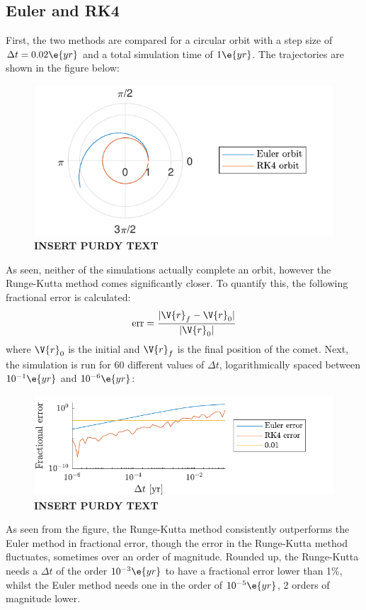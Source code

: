 \documentclass[a4paper,10pt]{article} 	%
\numberwithin{equation}{section}
\begin{document}
 	\subsection{Euler and RK4}
 	First, the two methods are compared for a circular orbit with a step size of $ \Delta t = 0.02 \e{yr} $ and a total simulation time of $ 1 \e{yr} $. The trajectories are shown in the figure below:
 	
	\begin{figure}[H]
		\centering
		\includegraphics[width=0.7\linewidth]{CircOrbit.pdf}
		\caption{\textbf{INSERT PURDY TEXT}}
		\label{fig:CircOrbit}
	\end{figure}
 	As seen, neither of the simulations actually complete an orbit, however the Runge-Kutta method comes significantly closer. To quantify this, the following fractional error is calculated:
 	\begin{equation}
 		\text{err} = \frac{|\V{r}_f-\V{r}_0|}{|\V{r}_0|}
 	\end{equation}
 	where $ \V{r}_0 $ is the initial and $ \V{r}_f $ is the final position of the comet. Next, the simulation is run for 60 different values of $ \Delta t $, logarithmically spaced between $ 10^{-1} \e{yr} $ and $ 10^{-6} \e{yr} $:
	\begin{figure}[H]
		\centering
		\includegraphics[width=0.8\linewidth]{KeplerdtErr.pdf}
		\caption{\textbf{INSERT PURDY TEXT}}
		\label{fig:KeplerdtErr}
	\end{figure}
	As seen from the figure, the Runge-Kutta method consistently outperforms the Euler method in fractional error, though the error in the Runge-Kutta method fluctuates, sometimes over an order of magnitude. Rounded up, the Runge-Kutta needs a $ \Delta t $ of the order $ 10^{-3} \e{yr} $ to have a fractional error lower than 1\%, whilst the Euler method needs one in the order of $ 10^{-5} \e{yr} $, 2 orders of magnitude lower.
	
\end{document}
